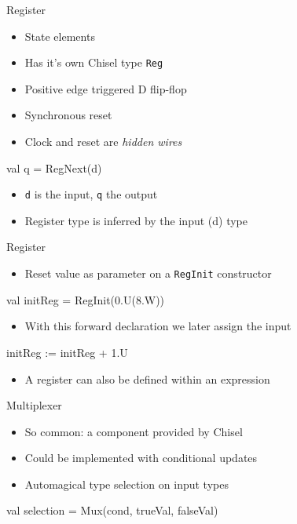 \documentclass[xcolor=pdflatex,dvipsnames,table]{beamer}
\newcommand{\code}[1]{{\texttt{#1}}}
\begin{document}
\begin{frame}[fragile]{Register}
\begin{itemize}
\item State elements
\item Has it's own Chisel type \code{Reg}
\item Positive edge triggered D flip-flop
\item Synchronous reset
\item Clock and reset are \emph{hidden wires}
\end{itemize}
\begin{chisel}
val q = RegNext(d)
\end{chisel}
\begin{itemize}
\item \code{d} is the input, \code{q} the output
\item Register type is inferred by the input (d) type
\end{itemize}
\end{frame}

\begin{frame}[fragile]{Register}
\begin{itemize}
\item Reset value as parameter on a \code{RegInit} constructor
\end{itemize}
\begin{chisel}
val initReg = RegInit(0.U(8.W))
\end{chisel}
\begin{itemize}
\item With this forward declaration we later assign the input
\end{itemize}
\begin{chisel}
initReg := initReg + 1.U
\end{chisel}
\begin{itemize}
\item A register can also be defined within an expression
\end{itemize}
\end{frame}

\begin{frame}[fragile]{Multiplexer}
\begin{itemize}
\item So common: a component provided by Chisel
\item Could be implemented with conditional updates
\item Automagical type selection on input types
\end{itemize}
\begin{chisel}
val selection = Mux(cond, trueVal, falseVal)
\end{chisel}
\end{frame}
\end{document}
